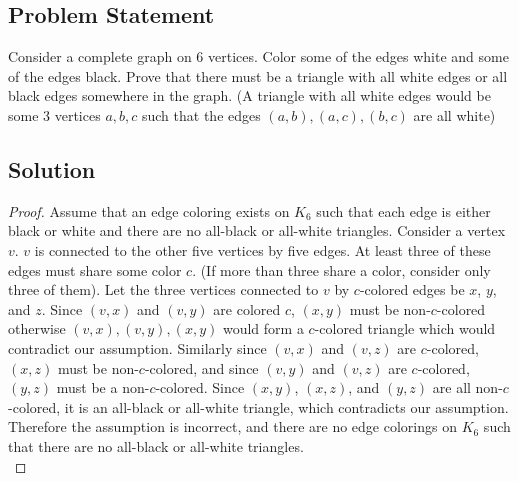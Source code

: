 \documentclass[12pt]{article}
\begin{document}
\subsection*{Problem Statement}
Consider a complete graph on 6 vertices. Color some of the edges white and some of the edges black. Prove that there must be a triangle with all white edges or all black edges somewhere in the graph. (A triangle with all white edges would be some 3 vertices $a,b,c$ such that the edges $(a,b), (a,c), (b,c)$ are all white)
\subsection*{Solution}
\begin{proof}
Assume that an edge coloring exists on $K_6$ such that each edge is either black or white and there are no all-black or all-white triangles. Consider a vertex $v$. $v$ is connected to the other five vertices by five edges. At least three of these edges must share some color $c$. (If more than three share a color, consider only three of them). Let the three vertices connected to $v$ by $c$-colored edges be $x$, $y$, and $z$. Since $(v,x)$ and $(v,y)$ are colored $c$, $(x,y)$ must be non-$c$-colored otherwise $(v,x), (v,y), (x,y)$ would form a $c$-colored triangle which would contradict our assumption. Similarly since $(v,x)$ and $(v,z)$ are $c$-colored, $(x,z)$ must be non-$c$-colored, and since $(v,y)$ and $(v,z)$ are $c$-colored, $(y,z)$ must be a non-$c$-colored. Since $(x,y)$, $(x,z)$, and $(y,z)$ are all non-$c$-colored, it is an all-black or all-white triangle, which contradicts our assumption. Therefore the assumption is incorrect, and there are no edge colorings on $K_6$ such that there are no all-black or all-white triangles.\\
\end{proof}
\end{document}
